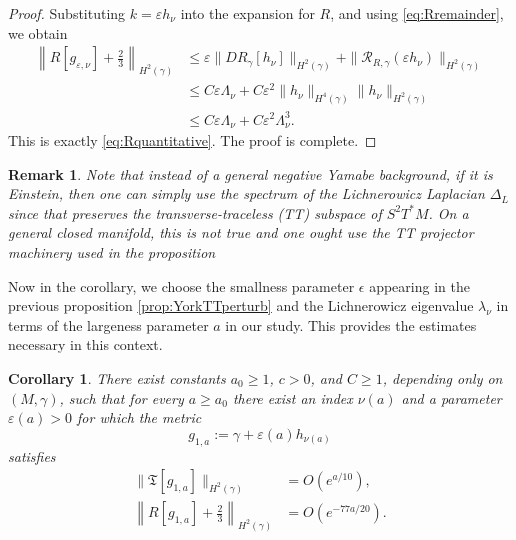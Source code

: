 \documentclass{amsart}
\newtheorem{remark}{Remark}
\newtheorem{corollary}{Corollary}[section]
\begin{document}
\begin{proof}
\noindent Substituting $k=\varepsilon h_\nu$ into the expansion for $R$, and using \eqref{eq:Rremainder}, we obtain
\begin{align*}
\left\|R[g_{\varepsilon,\nu}]+\frac23\right\|_{H^2(\gamma)}
&\le
\varepsilon\|DR_\gamma[h_\nu]\|_{H^2(\gamma)}
+
\|\mathcal R_{R,\gamma}(\varepsilon h_\nu)\|_{H^2(\gamma)}\\
&\le
C\varepsilon\Lambda_\nu
+
C\varepsilon^2
\|h_\nu\|_{H^4(\gamma)}
\|h_\nu\|_{H^2(\gamma)}\\
&\le
C\varepsilon\Lambda_\nu
+
C\varepsilon^2\Lambda_\nu^3.
\end{align*}
This is exactly \eqref{eq:Rquantitative}. The proof is complete.
\end{proof}

\begin{remark}
Note that instead of a general negative Yamabe background, if it is Einstein, then one can simply use the spectrum of the Lichnerowicz Laplacian $\Delta_{L}$ since that preserves the transverse-traceless (TT) subspace of $S^{2}T^{*}M$. On a general closed manifold, this is not true and one ought use the TT projector machinery used in the proposition     
\end{remark}


\noindent Now in the corollary, we choose the smallness parameter $\epsilon$ appearing in the previous proposition \ref{prop:YorkTTperturb} and the Lichnerowicz eigenvalue $\lambda_{\nu}$ in terms of the largeness parameter $a$ in our study. This provides the estimates necessary in this context.
\begin{corollary}
\label{cor:separation-scales}
There exist constants \(a_{0}\geq 1\), \(c>0\), and \(C\geq 1\), depending only on \((M,\gamma)\), such that for every \(a\geq a_{0}\) there exist an index \(\nu(a)\) and a parameter \(\varepsilon(a)>0\) for which the metric
\[
g_{1,a}:=\gamma+\varepsilon(a) h_{\nu(a)}
\]
satisfies
\begin{align}
\label{eq:Tlargecor}
\|\mathfrak T[g_{1,a}]\|_{H^{2}(\gamma)}&=O(e^{a/10}),\\
\label{eq:Rsmallcor}
\left\|R[g_{1,a}]+\frac23\right\|_{H^{2}(\gamma)}&= O(e^{-77a/20}).
\end{align}
\end{corollary}
\end{document}
